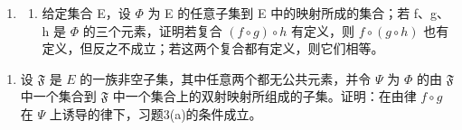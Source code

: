 \begin{enumerate}
\def\labelenumi{\arabic{enumi}.}
\setcounter{enumi}{3}
\tightlist
\item
  \begin{enumerate}
  \def\labelenumii{(\alph{enumii})}
  \tightlist
  \item
    给定集合 E，设 \(\Phi\) 为 E 的任意子集到 E 中的映射所成的集合；若 f、g、h 是 \(\Phi\) 的三个元素，证明若复合 \((f \circ g) \circ h\) 有定义，则 \(f \circ (g \circ h)\) 也有定义，但反之不成立；若这两个复合都有定义，则它们相等。
  \end{enumerate}
\end{enumerate}

\begin{enumerate}
\def\labelenumi{(\alph{enumi})}
\setcounter{enumi}{1}
\tightlist
\item
  设 \(\mathfrak{F}\) 是 \(E\) 的一族非空子集，其中任意两个都无公共元素，并令 \(\Psi\) 为 \(\Phi\) 的由 \(\mathfrak{F}\) 中一个集合到 \(\mathfrak{F}\) 中一个集合上的双射映射所组成的子集。证明：在由律 \(f \circ g\) 在 \(\Psi\) 上诱导的律下，习题3(a)的条件成立。
\end{enumerate}

